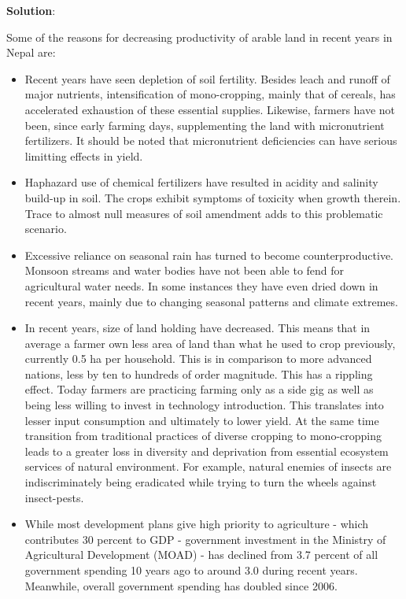 \documentclass[
  openany]{book}
\newenvironment{solution}{ {\bfseries Solution}:}{}
\begin{document}
\begin{questions}
\begin{solution}

Some of the reasons for decreasing productivity of arable land in recent years in Nepal are:

\begin{itemize}
\item Recent years have seen depletion of soil fertility. Besides leach and runoff of major nutrients, intensification of mono-cropping, mainly that of cereals, has accelerated exhaustion of these essential supplies. Likewise, farmers have not been, since early farming days, supplementing the land with micronutrient fertilizers. It should be noted that micronutrient deficiencies can have serious limitting effects in yield.
\item Haphazard use of chemical fertilizers have resulted in acidity and salinity build-up in soil. The crops exhibit symptoms of toxicity when growth therein. Trace to almost null measures of soil amendment adds to this problematic scenario.
\item Excessive reliance on seasonal rain has turned to become counterproductive. Monsoon streams and water bodies have not been able to fend for agricultural water needs. In some instances they have even dried down in recent years, mainly due to changing seasonal patterns and climate extremes.
\item In recent years, size of land holding have decreased. This means that in average a farmer own less area of land than what he used to crop previously, currently 0.5 ha per household. This is in comparison to more advanced nations, less by ten to hundreds of order magnitude. This has a rippling effect. Today farmers are practicing farming only as a side gig as well as being less willing to invest in technology introduction. This translates into lesser input consumption and ultimately to lower yield. At the same time transition from traditional practices of diverse cropping to mono-cropping leads to a greater loss in diversity and deprivation from essential ecosystem services of natural environment. For example, natural enemies of insects are indiscriminately being eradicated while trying to turn the wheels against insect-pests. 
\item While most development plans give high priority to agriculture - which contributes 30 percent to GDP - government investment in the Ministry of Agricultural Development (MOAD) - has declined from 3.7 percent of all government spending 10 years ago to around 3.0 during recent years. Meanwhile, overall government spending has doubled since 2006.


\end{itemize}
\end{solution}
\end{questions}
\end{document}

